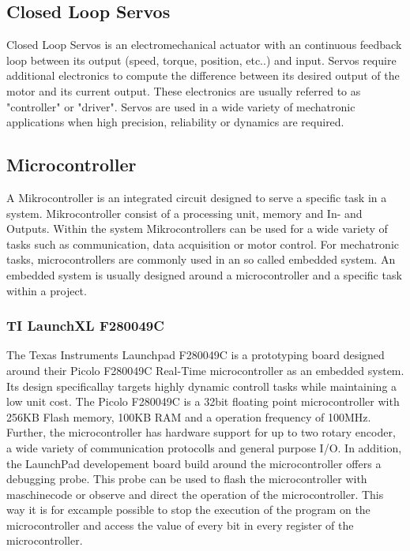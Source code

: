 \subsection{Closed Loop Servos}
Closed Loop Servos is an electromechanical actuator with an continuous feedback loop between its output (speed, torque, position, etc..) and input. 
Servos require additional electronics to compute the difference between its desired output of the motor and its current output. These electronics are usually referred to as "controller" or "driver".
Servos are used in a wide variety of mechatronic applications when high precision, reliability or dynamics are required.\cite{ServoSuh2008}

\subsection{Microcontroller}
A Mikrocontroller is an integrated circuit designed to serve a specific task in a system. Mikrocontroller consist of a processing unit, memory and In- and Outputs. 
Within the system Mikrocontrollers can be used for a wide variety of tasks such as communication, data acquisition or motor control. For mechatronic tasks, microcontrollers are commonly used in an so called embedded system. 
An embedded system is usually designed around a microcontroller and a specific task within a project.\cite{UensalanMicrocont2022}

\subsubsection{TI LaunchXL F280049C}
The Texas Instruments Launchpad F280049C is a prototyping board designed around their Picolo F280049C Real-Time microcontroller as an embedded system. Its design specificallay targets highly dynamic controll tasks while maintaining a low unit cost.
The Picolo F280049C is a 32bit floating point microcontroller with 256KB Flash memory, 100KB RAM and a operation frequency of 100MHz. 
Further, the microcontroller has hardware support for up to two rotary encoder, a wide variety of communication protocolls and general purpose I/O. 
In addition, the LaunchPad developement board build around the microcontroller offers a debugging probe. This probe can be used to flash the microcontroller with maschinecode or observe and direct the operation of the microcontroller. 
This way it is for excample possible to stop the execution of the program on the microcontroller and access the value of every bit in every register of the microcontroller.\cite{TILAUNCHXL}

